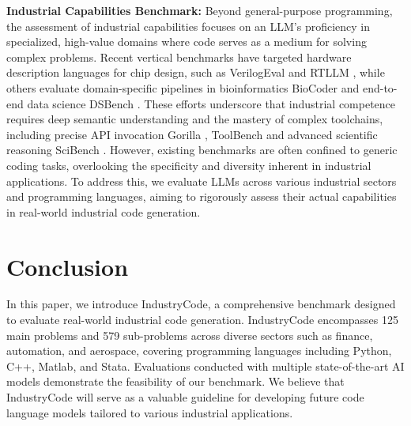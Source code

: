 \documentclass{article}
\theoremstyle{plain}
\theoremstyle{definition}
\theoremstyle{remark}
\begin{document}
\textbf{Industrial Capabilities Benchmark:} 
Beyond general-purpose programming, the assessment of industrial capabilities focuses on an LLM’s proficiency in specialized, high-value domains where code serves as a medium for solving complex problems. Recent vertical benchmarks have targeted hardware description languages for chip design, such as VerilogEval \cite{liu2023verilogeval} and RTLLM \cite{lu2023rtllm}, while others evaluate domain-specific pipelines in bioinformatics BioCoder \cite{tang2023biocoder} and end-to-end data science DSBench \cite{liu2024dsbench}. These efforts underscore that industrial competence requires deep semantic understanding and the mastery of complex toolchains, including precise API invocation Gorilla \cite{patil2023gorilla}, ToolBench \cite{qin2023tool} and advanced scientific reasoning SciBench \cite{wang2023scibench}. However, existing benchmarks are often confined to generic coding tasks, overlooking the specificity and diversity inherent in industrial applications. To address this, we evaluate LLMs across various industrial sectors and programming languages, aiming to rigorously assess their actual capabilities in real-world industrial code generation.



\section{Conclusion}
In this paper, we introduce IndustryCode, a comprehensive benchmark designed to evaluate real-world industrial code generation. 
IndustryCode encompasses 125 main problems and 579 sub-problems across diverse sectors such as finance, 
automation, and aerospace, covering programming languages including Python, C++, Matlab, and Stata. 
Evaluations conducted with multiple state-of-the-art AI models demonstrate the feasibility of our benchmark. 
We believe that IndustryCode will serve as a valuable guideline for developing future code language models tailored to various industrial applications.







\newpage
\appendix
\onecolumn
\end{document}
